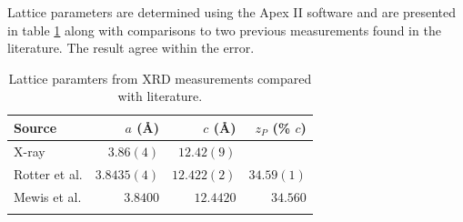 Lattice parameters are determined using the Apex II software and are presented in table \ref{Table:ResD:LatticeParams} along with comparisons to two previous measurements found in the literature. The result agree within the error.
\begin{table}[htbp]
    \begin{center}
        \caption{Lattice paramters from \ac{XRD} measurements compared with literature.}
        \begin{tabular}{lrrr}
\toprule
Source  &  $a$ (\AA) & $c$ (\AA) & $z_P$ (\% $c$)\\
\midrule
X-ray   & $3.86(4)$  & $12.42(9)$ & \\
Rotter et al.\cite{Rotter2010} & $3.8435(4) $ & $12.422(2)$ & $34.59(1)$ \\
Mewis et al.\cite{Mewis1980} & $3.8400$ & $12.4420$ & $34.560$ \\
\bottomrule
        \label{Table:ResD:LatticeParams}
        \end{tabular}
    \end{center}
\end{table}
